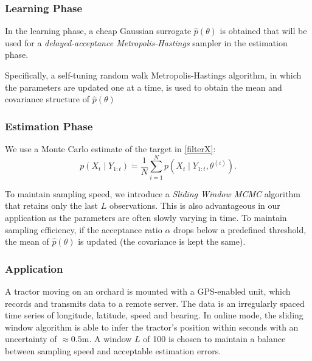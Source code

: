 \documentclass{beamer}
\begin{document}

\begin{frame}
\frametitle{Learning Phase}

In the learning phase, a cheap Gaussian surrogate $\hat{p}(\theta)$ is obtained that will be used for a \textit{delayed-acceptance Metropolis-Hastings} sampler in the estimation phase. 

Specifically, a self-tuning random walk Metropolis-Hastings algorithm, in which the parameters are updated one at a time, is used to obtain the mean and covariance structure of $\hat{p}(\theta)$  

\end{frame}

\begin{frame}
\frametitle{Estimation Phase}

We use a Monte Carlo estimate of the target in \eqref{filterX}:
\begin{equation}
p(X_t\mid Y_{1:t}) \dot{=} \frac{1}{N}\sum_{i=1}^{N}p(X_t\mid Y_{1:t},\theta^{(i)}). 
\end{equation}

To maintain sampling speed, we introduce a \textit{Sliding Window MCMC} algorithm that retains only the last $L$ observations. This is also advantageous in our application as the parameters are often slowly varying in time. To maintain sampling efficiency, if the acceptance ratio $\alpha$ drops below a predefined threshold, the mean of $\hat{p}(\theta)$ is updated (the covariance is kept the same). 

\end{frame}






\begin{frame}
\frametitle{Application}
A tractor moving on an orchard is mounted with a GPS-enabled unit, which records
and transmits data to a remote server. The data is an irregularly spaced time series of longitude, latitude, speed and bearing. In online mode, the sliding window algorithm is able to infer the tractor's position within seconds with an uncertainty of $\approx 0.5\text{m}$. A window $L$ of 100 is chosen to maintain a balance between sampling speed and acceptable estimation errors. 
\end{frame}

\end{document}
